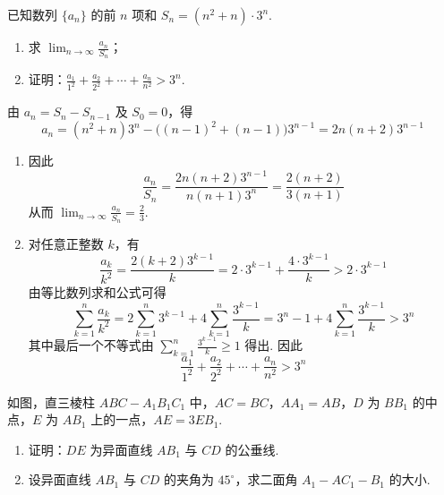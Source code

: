\begin{problem}
已知数列 \(\{a_{n}\}\) 的前 \(n\) 项和 \(S_{n} = (n^{2} + n)\cdot 3^{n}\).
\begin{enumerate}
\item 求 \(\displaystyle\lim_{n\to\infty}\frac{a_{n}}{S_{n}}\)；
\item 证明：\(\frac{a_{1}}{1^{2}} + \frac{a_{2}}{2^{2}} + \cdots + \frac{a_{n}}{n^{2}} > 3^{n}\).
\end{enumerate}
\end{problem}

\begin{solution}
由 \(a_n=S_n-S_{n-1}\) 及 \(S_0=0\)，得
\[
a_n=(n^2+n)3^n-\bigl((n-1)^2+(n-1)\bigr)3^{n-1}=2n(n+2)3^{n-1}
\]

\begin{enumerate}
\item 因此
\[
\frac{a_n}{S_n}=\frac{2n(n+2)3^{n-1}}{n(n+1)3^n}=\frac{2(n+2)}{3(n+1)}
\]
从而 \(\displaystyle\lim_{n\to\infty}\frac{a_n}{S_n}=\frac{2}{3}\).

\item 对任意正整数 \(k\)，有
\[
\frac{a_k}{k^2}=\frac{2(k+2)3^{k-1}}{k}=2\cdot 3^{k-1}+\frac{4\cdot 3^{k-1}}{k}>2\cdot 3^{k-1}
\]
由等比数列求和公式可得
\[
\sum_{k=1}^{n}\frac{a_k}{k^2}
=2\sum_{k=1}^{n}3^{k-1}+4\sum_{k=1}^{n}\frac{3^{k-1}}{k}
=3^n-1+4\sum_{k=1}^{n}\frac{3^{k-1}}{k}>3^n
\]
其中最后一个不等式由 \(\sum_{k=1}^{n}\frac{3^{k-1}}{k}\geqslant1\) 得出. 因此
\[
\frac{a_1}{1^2}+\frac{a_2}{2^2}+\cdots+\frac{a_n}{n^2}>3^n
\]
\end{enumerate}
\end{solution}

\begin{problem}
如图，直三棱柱 \(ABC - A_{1}B_{1}C_{1}\) 中，\(AC = BC\)，\(AA_{1} = AB\)，\(D\) 为 \(BB_{1}\) 的中点，\(E\) 为 \(AB_{1}\) 上的一点，\(AE = 3EB_{1}\).
\begin{enumerate}
\item 证明：\(DE\) 为异面直线 \(AB_{1}\) 与 \(CD\) 的公垂线.
\item 设异面直线 \(AB_{1}\) 与 \(CD\) 的夹角为 \(45^{\circ}\)，求二面角 \(A_{1} - AC_{1} - B_{1}\) 的大小.
\end{enumerate}
\end{problem}

